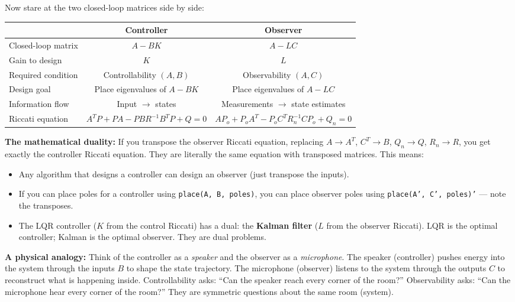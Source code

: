 Now stare at the two closed-loop matrices side by side:

\begin{center}
\begin{tabular}{lcc}
\toprule
 & \textbf{Controller} & \textbf{Observer} \\
\midrule
Closed-loop matrix & $A - BK$ & $A - LC$ \\
Gain to design & $K$ & $L$ \\
Required condition & Controllability $(A, B)$ & Observability $(A, C)$ \\
Design goal & Place eigenvalues of $A - BK$ & Place eigenvalues of $A - LC$ \\
Information flow & Input $\to$ states & Measurements $\to$ state estimates \\
Riccati equation & $A^TP + PA - PBR^{-1}B^TP + Q = 0$ & $AP_o + P_oA^T - P_oC^TR_n^{-1}CP_o + Q_n = 0$ \\
\bottomrule
\end{tabular}
\end{center}

\textbf{The mathematical duality:} If you transpose the observer Riccati equation, replacing $A \to A^T$, $C^T \to B$, $Q_n \to Q$, $R_n \to R$, you get exactly the controller Riccati equation. They are literally the same equation with transposed matrices. This means:

\begin{itemize}
    \item Any algorithm that designs a controller can design an observer (just transpose the inputs).
    \item If you can place poles for a controller using \texttt{place(A, B, poles)}, you can place observer poles using \texttt{place(A', C', poles)'} --- note the transposes.
    \item The LQR controller ($K$ from the control Riccati) has a dual: the \textbf{Kalman filter} ($L$ from the observer Riccati). LQR is the optimal controller; Kalman is the optimal observer. They are dual problems.
\end{itemize}

\textbf{A physical analogy:} Think of the controller as a \textit{speaker} and the observer as a \textit{microphone}. The speaker (controller) pushes energy into the system through the inputs $B$ to shape the state trajectory. The microphone (observer) listens to the system through the outputs $C$ to reconstruct what is happening inside. Controllability asks: ``Can the speaker reach every corner of the room?'' Observability asks: ``Can the microphone hear every corner of the room?'' They are symmetric questions about the same room (system).

